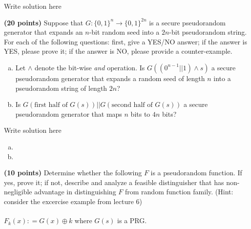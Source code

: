 \documentclass[12pt]{hw}
\begin{document}
\begin{answer}
Write solution here
\end{answer}



\begin{exercise}
  \textbf{(20 points)} 
  Suppose that $G: \{0, 1\}^n \rightarrow \{0, 1\}^{2n}$ is a secure pseudorandom generator that expands an $n$-bit random seed into a $2n$-bit pseudorandom string. For each of the following questions: first, give a YES/NO answer; if the answer is YES, please prove it; if the answer is NO, please provide a counter-example.
  \begin{enumerate}[(a)]
  \item Let $\wedge$ denote the bit-wise \emph{and} operation. Is $G((0^{n-1}||1) \wedge s)$ a secure pseudorandom generator that expands a random seed of length $n$ into a pseudorandom string of length $2n$? 

  \item Is $G\left(\text{first half of } G(s)\right) || G\left(\text{second half of } G(s)\right)$ a secure pseudorandom generator that maps $n$ bits to $4n$ bits?
  \end{enumerate}
\end{exercise}

\begin{answer}
Write solution here
  \begin{enumerate}[(a)]

  \item 

  \item  
  \end{enumerate}

\end{answer}


\begin{exercise}
  \textbf{(10 points)} Determine whether the following $F$ is a pseudorandom function. If yes, prove it; if not, describe and analyze a feasible distinguisher that has non-negligible advantage in distinguishing $F$ from random function family. (Hint: consider the excercise example from lecture 6)\\\\
      $F_k(x) : = G(x) \oplus k$ where $G(s)$ is a PRG.
\end{exercise}
\end{document}
